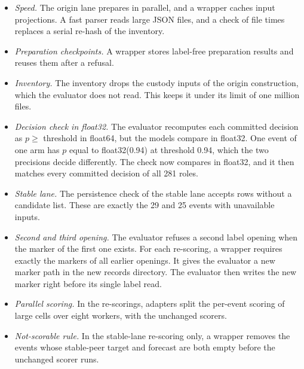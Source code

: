 \begin{itemize}\setlength{\itemsep}{0pt}
\item \emph{Speed.} The origin lane prepares in parallel, and a wrapper caches input projections.
A fast parser reads large JSON files, and a check of file times replaces a serial re-hash of the inventory.
\item \emph{Preparation checkpoints.} A wrapper stores label-free preparation results and reuses them after a refusal.
\item \emph{Inventory.} The inventory drops the custody inputs of the origin construction, which the evaluator does not read.
This keeps it under its limit of one million files.
\item \emph{Decision check in float32.} The evaluator recomputes each committed decision as $p \geq$ threshold in float64, but the models compare in float32.
One event of one arm has $p$ equal to float32(0.94) at threshold 0.94, which the two precisions decide differently.
The check now compares in float32, and it then matches every committed decision of all 281 roles.
\item \emph{Stable lane.} The persistence check of the stable lane accepts rows without a candidate list.
These are exactly the 29 and 25 events with unavailable inputs.
\item \emph{Second and third opening.} The evaluator refuses a second label opening when the marker of the first one exists.
For each re-scoring, a wrapper requires exactly the markers of all earlier openings.
It gives the evaluator a new marker path in the new records directory.
The evaluator then writes the new marker right before its single label read.
\item \emph{Parallel scoring.} In the re-scorings, adapters split the per-event scoring of large cells over eight workers, with the unchanged scorers.
\item \emph{Not-scorable rule.} In the stable-lane re-scoring only, a wrapper removes the events whose stable-peer target and forecast are both empty before the unchanged scorer runs.
\end{itemize}
